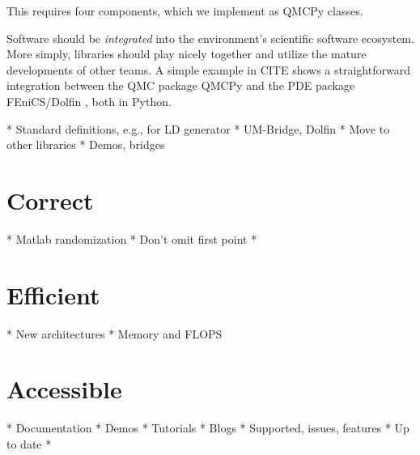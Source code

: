 \documentclass[graybox]{svmult}
\newcommand{\AGSComment}[1]{{\color{red} #1}}
\begin{document}

This requires four components, which we implement as QMCPy classes.


Software should be \emph{integrated} into the environment's scientific software ecosystem. More simply, libraries should play nicely together and utilize the mature developments of other teams. A simple example in \AGSComment{CITE} shows a straightforward integration between the QMC package QMCPy \cite{QMCPy2020a} and the PDE package FEniCS/Dolfin \cite{LoggEtal_10_2012}, both in Python.




* Standard definitions, e.g., for LD generator
* UM-Bridge, Dolfin
* Move to other libraries
* Demos, bridges



\section{Correct} \label{CDHS_sec:correct}
* Matlab randomization
* Don't omit first point
*


\section{Efficient} \label{CDHS_sec:efficient}
* New architectures
* Memory and FLOPS

\section{Accessible} \label{CDHS_sec:accessible}
* Documentation
* Demos
* Tutorials
* Blogs
* Supported, issues, features
* Up to date
*
\end{document}
